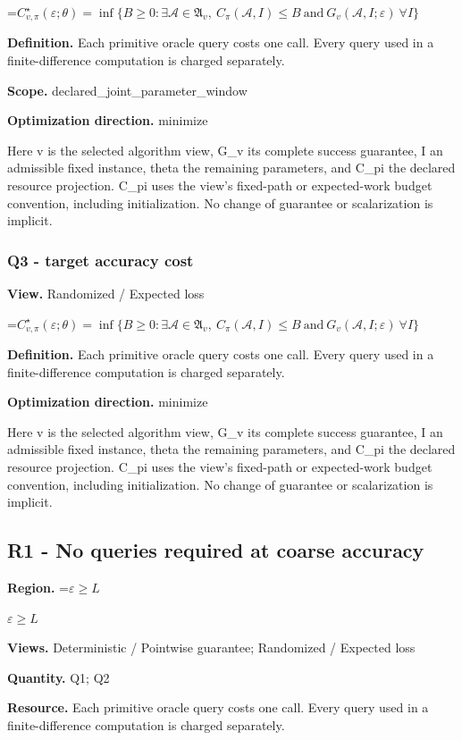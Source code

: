 \documentclass[10pt,a4paper]{article}
\newcommand{\AtlasMath}[1]{\par\begingroup\centering\setbox0=\hbox{$\displaystyle #1$}\ifdim\wd0>1.4\linewidth\typeout{ATLAS WIDE FORMULA: \the\wd0}\fi\ifdim\wd0>\linewidth\resizebox{\linewidth}{!}{\box0}\else\box0\fi\par\endgroup}
\newcommand{\AtlasInlineMath}[1]{\begingroup\setbox0=\hbox{$#1$}\ifdim\wd0>.4\linewidth\endgroup\AtlasMath{#1}\else\endgroup$#1$\fi}
\begin{document}
\AtlasMath{C^\star_{v,\pi}(\varepsilon;\theta)=\inf\{B\ge0:\exists\mathcal A\in\mathfrak A_v,\ C_\pi(\mathcal A,I)\le B\ \text{and}\ G_v(\mathcal A,I;\varepsilon)\ \forall I\}}
\textbf{Definition.} Each primitive oracle query costs one call. Every query used in a finite-difference computation is charged separately.

\textbf{Scope.} declared\_joint\_parameter\_window

\textbf{Optimization direction.} minimize

Here v is the selected algorithm view, G\_v its complete success guarantee, I an admissible fixed instance, theta the remaining parameters, and C\_pi the declared resource projection. C\_pi uses the view's fixed-path or expected-work budget convention, including initialization. No change of guarantee or scalarization is implicit.

\subsubsection{Q3 - target accuracy cost}
\textbf{View.} Randomized / Expected loss

\AtlasMath{C^\star_{v,\pi}(\varepsilon;\theta)=\inf\{B\ge0:\exists\mathcal A\in\mathfrak A_v,\ C_\pi(\mathcal A,I)\le B\ \text{and}\ G_v(\mathcal A,I;\varepsilon)\ \forall I\}}
\textbf{Definition.} Each primitive oracle query costs one call. Every query used in a finite-difference computation is charged separately.

\textbf{Optimization direction.} minimize

Here v is the selected algorithm view, G\_v its complete success guarantee, I an admissible fixed instance, theta the remaining parameters, and C\_pi the declared resource projection. C\_pi uses the view's fixed-path or expected-work budget convention, including initialization. No change of guarantee or scalarization is implicit.

\subsection{R1 - No queries required at coarse accuracy}
\textbf{Region.} \AtlasInlineMath{\varepsilon\ge L}

\textbf{Views.} Deterministic / Pointwise guarantee; Randomized / Expected loss

\textbf{Quantity.} Q1; Q2

\textbf{Resource.} Each primitive oracle query costs one call. Every query used in a finite-difference computation is charged separately.
\end{document}
